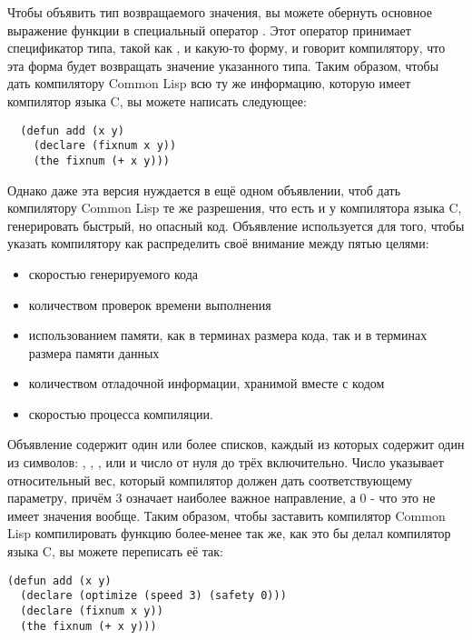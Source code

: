 Чтобы объявить тип возвращаемого значения, вы можете обернуть основное выражение функции
 в специальный оператор . Этот оператор принимает спецификатор
типа, такой как , и какую-то форму, и говорит компилятору, что эта форма
будет возвращать значение указанного типа. Таким образом, чтобы дать компилятору Common
Lisp всю ту же информацию, которую имеет компилятор языка C, вы можете написать следующее:

\begin{lstlisting}
  (defun add (x y)
    (declare (fixnum x y))
    (the fixnum (+ x y)))
\end{lstlisting}

Однако даже эта версия нуждается в ещё одном объявлении, чтоб дать компилятору Common Lisp
те же разрешения, что есть и у компилятора языка C, генерировать быстрый, но опасный
код. Объявление  используется для того, чтобы указать компилятору как
распределить своё внимание между пятью целями:

\begin{itemize}
\item скоростью генерируемого кода
\item количеством проверок времени выполнения
\item использованием памяти, как в терминах размера кода, так и в терминах размера памяти
  данных
\item количеством отладочной информации, хранимой вместе с кодом
\item скоростью процесса компиляции.
\end{itemize}

Объявление  содержит один или более списков, каждый из которых содержит
один из символов: , , ,  или
 и число от нуля до трёх включительно. Число указывает
относительный вес, который компилятор должен дать соответствующему параметру, причём 3
означает наиболее важное направление, а 0 - что это не имеет значения вообще. Таким
образом, чтобы заставить компилятор Common Lisp компилировать функцию 
более-менее так же, как это бы делал компилятор языка C, вы можете переписать её так:

\begin{lstlisting}
(defun add (x y)
  (declare (optimize (speed 3) (safety 0)))
  (declare (fixnum x y))
  (the fixnum (+ x y)))
\end{lstlisting}

